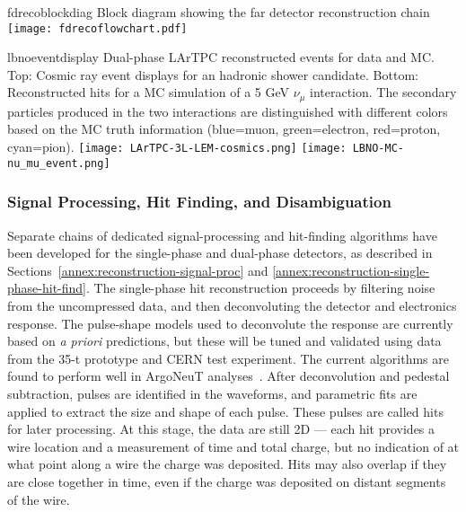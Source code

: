 \begin{cdrfigure}{fdrecoblockdiag}
{Block diagram showing the far detector reconstruction chain}
\texttt{[image: fdrecoflowchart.pdf]}
\end{cdrfigure}


\begin{cdrfigure}{lbnoeventdisplay}
{
Dual-phase LArTPC reconstructed events for data and MC.
Top: Cosmic ray event displays for an hadronic shower candidate.
Bottom: Reconstructed hits for a MC simulation of a 5 GeV $\nu_{\mu}$ interaction.
The secondary particles produced in the two interactions are distinguished with different colors based on the MC truth information (blue=muon, green=electron, red=proton, cyan=pion).
}
\texttt{[image: LArTPC-3L-LEM-cosmics.png]}
\texttt{[image: LBNO-MC-nu\_mu\_event.png]}
\end{cdrfigure}

\subsubsection{Signal Processing, Hit Finding, and Disambiguation}

Separate chains of dedicated signal-processing and hit-finding 
algorithms have been developed for the single-phase and dual-phase detectors,
as described in  Sections~\ref{annex:reconstruction-signal-proc} and \ref{annex:reconstruction-single-phase-hit-find}.
The single-phase hit reconstruction proceeds by filtering noise
from the uncompressed data, and then deconvoluting the 
detector and electronics response.
The pulse-shape models used to deconvolute the response are currently
based on \textit{a priori} predictions, but these will be tuned and
validated using data from the 35-t prototype and CERN test experiment. 
The current algorithms are found to perform well in ArgoNeuT analyses~\cite{Anderson:2012vc}.
After deconvolution and pedestal subtraction, pulses are identified in
the waveforms, and parametric fits are applied to extract the size and
shape of each pulse. These pulses are called hits for later processing. 
At this stage, the data are still 2D --- each hit provides
a wire location and a measurement of time and total charge,
but no indication of at what point along a wire the charge was deposited.
Hits may also overlap if they are close together in time, 
even if the charge was deposited on distant segments of the wire.

